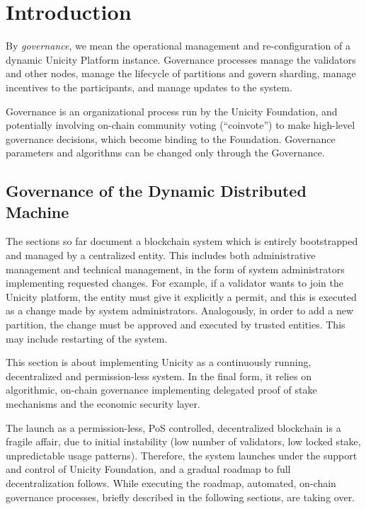 \chapter{Introduction}

By \emph{governance}, we mean the operational management and re-configuration of a dynamic Unicity Platform instance. Governance processes manage the validators and other nodes, manage the lifecycle of partitions and govern sharding, manage incentives to the participants, and manage updates to the system.

Governance is an organizational process run by the Unicity Foundation, and potentially involving on-chain community voting (``coinvote'') to make high-level governance decisions, which become binding to the Foundation. Governance parameters and algorithms can be changed only through the Governance.


\section{Governance of the Dynamic Distributed Machine}\label{sec:governance-dynamic}

The sections so far document a blockchain system which is entirely bootstrapped and managed by a centralized entity. This includes both administrative management and technical management, in the form of system administrators implementing requested changes. For example, if a validator wants to join the Unicity platform, the entity must give it explicitly a permit, and this is executed as a change made by system administrators. Analogously, in order to add a new partition, the change must be approved and executed by trusted entities. This may include restarting of the system.

This section is about implementing Unicity as a continuously running, decentralized and permission-less system. In the final form, it relies on algorithmic, on-chain governance implementing delegated proof of stake mechanisms and the economic security layer.

The launch as a permission-less, PoS controlled, decentralized blockchain is a fragile affair, due to initial instability (low number of validators, low locked stake, unpredictable usage patterns). Therefore, the system launches under the support and control of Unicity Foundation, and a gradual roadmap to full decentralization follows. While executing the roadmap, automated, on-chain governance processes, briefly described in the following sections, are taking over.

